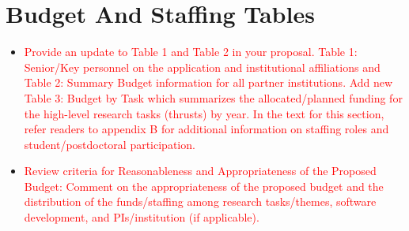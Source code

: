 \section{Budget And Staffing Tables}
\label{sec:budget}
\begin{itemize}
    \item \textcolor{red}{Provide an update to Table 1 and Table 2 in your proposal. Table 1: Senior/Key personnel on the application and institutional affiliations and Table 2: Summary Budget information for all partner institutions. Add new Table 3: Budget by Task which summarizes the allocated/planned funding for the high-level research tasks (thrusts) by year. In the text for this section, refer readers to appendix B for additional information on staffing roles and student/postdoctoral participation.}
    \item \textcolor{red}{Review criteria for Reasonableness and Appropriateness of the Proposed Budget: Comment on the appropriateness of the proposed budget and the distribution of the funds/staffing among research tasks/themes, software development, and PIs/institution (if applicable).
}

\end{itemize}


